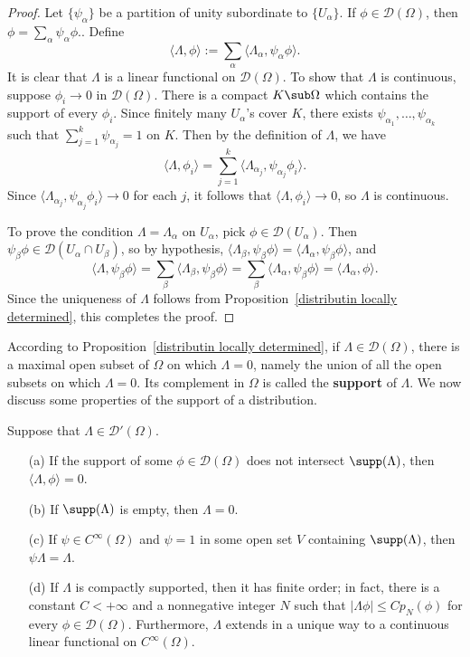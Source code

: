 \begin{proof}
Let $\{\psi_\alpha\}$ be a partition of unity subordinate to $\{U_\alpha\}$. If $\phi\in\mathscr{D}(\Omega)$, then $\phi=\sum_\alpha\psi_\alpha\phi$.. Define
\[\langle\Lambda,\phi\rangle:=\sum_{\alpha}\langle\Lambda_\alpha,\psi_\alpha\phi\rangle.\]
It is clear that $\Lambda$ is a linear functional on $\mathscr{D}(\Omega)$. To show that $\Lambda$ is continuous, suppose $\phi_i\to 0$ in $\mathscr{D}(\Omega)$. There is a compact $K\sub\Omega$ which contains the support of every $\phi_i$. Since finitely many $U_\alpha$'s cover $K$, there exists $\psi_{\alpha_1},\dots,\psi_{\alpha_k}$ such that $\sum_{j=1}^{k}\psi_{\alpha_j}=1$ on $K$. Then by the definition of $\Lambda$, we have
\[\langle\Lambda,\phi_i\rangle=\sum_{j=1}^{k}\langle\Lambda_{\alpha_j},\psi_{\alpha_j}\phi_i\rangle.\]
Since $\langle\Lambda_{\alpha_j},\psi_{\alpha_j}\phi_i\rangle\to 0$ for each $j$, it follows that $\langle\Lambda,\phi_i\rangle\to 0$, so $\Lambda$ is continuous.\par
To prove the condition $\Lambda=\Lambda_\alpha$ on $U_\alpha$, pick $\phi\in\mathscr{D}(U_\alpha)$. Then $\psi_\beta\phi\in\mathscr{D}(U_\alpha\cap U_\beta)$, so by hypothesis, $\langle\Lambda_\beta,\psi_\beta\phi\rangle=\langle\Lambda_\alpha,\psi_\beta\phi\rangle$, and
\[\langle\Lambda,\psi_\beta\phi\rangle=\sum_\beta\langle\Lambda_\beta,\psi_\beta\phi\rangle=\sum_\beta\langle\Lambda_\alpha,\psi_\beta\phi\rangle=\langle\Lambda_\alpha,\phi\rangle.\]
Since the uniqueness of $\Lambda$ follows from Proposition~\ref{distributin locally determined}, this completes the proof.
\end{proof}
According to Proposition~\ref{distributin locally determined}, if $\Lambda\in\mathscr{D}(\Omega)$, there is a maximal open subset of $\Omega$ on which $\Lambda=0$, namely the union of all the open subsets on which $\Lambda=0$. Its complement in $\Omega$ is called the \textbf{support} of $\Lambda$. We now discuss some properties of the support of a distribution.
\begin{theorem}\label{distribution support prop}
Suppose that $\Lambda\in\mathscr{D}'(\Omega)$.
\begin{itemize}
\item[(a)] If the support of some $\phi\in\mathscr{D}(\Omega)$ does not intersect $\supp(\Lambda)$, then $\langle\Lambda,\phi\rangle=0$.
\item[(b)] If $\supp(\Lambda)$ is empty, then $\Lambda=0$.
\item[(c)] If $\psi\in C^\infty(\Omega)$ and $\psi=1$ in some open set $V$ containing $\supp(\Lambda)$, then $\psi\Lambda=\Lambda$.
\item[(d)] If $\Lambda$ is compactly supported, then it has finite order; in fact, there is a constant $C<+\infty$ and a nonnegative integer $N$ such that $|\Lambda\phi|\leq Cp_N(\phi)$ for every $\phi\in\mathscr{D}(\Omega)$. Furthermore, $\Lambda$ extends in a unique way to a continuous linear functional on $C^\infty(\Omega)$.
\end{itemize}
\end{theorem}
